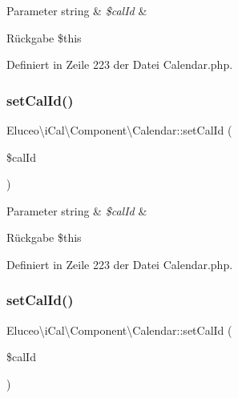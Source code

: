 \begin{DoxyParams}[1]{Parameter}
string & {\em \$cal\+Id} & \\
\hline
\end{DoxyParams}
\begin{DoxyReturn}{Rückgabe}
\$this 
\end{DoxyReturn}


Definiert in Zeile 223 der Datei Calendar.\+php.

\mbox{\label{class_eluceo_1_1i_cal_1_1_component_1_1_calendar_a17acdac642afaf8e87e305fa44621564}} 
\subsubsection{\texorpdfstring{set\+Cal\+Id()}{setCalId()}\hspace{0.1cm}{\footnotesize\ttfamily [2/3]}}
{\footnotesize\ttfamily Eluceo\textbackslash{}i\+Cal\textbackslash{}\+Component\textbackslash{}\+Calendar\+::set\+Cal\+Id (\begin{DoxyParamCaption}\item[{}]{\$cal\+Id }\end{DoxyParamCaption})}


\begin{DoxyParams}[1]{Parameter}
string & {\em \$cal\+Id} & \\
\hline
\end{DoxyParams}
\begin{DoxyReturn}{Rückgabe}
\$this 
\end{DoxyReturn}


Definiert in Zeile 223 der Datei Calendar.\+php.

\mbox{\label{class_eluceo_1_1i_cal_1_1_component_1_1_calendar_a17acdac642afaf8e87e305fa44621564}} 
\subsubsection{\texorpdfstring{set\+Cal\+Id()}{setCalId()}\hspace{0.1cm}{\footnotesize\ttfamily [3/3]}}
{\footnotesize\ttfamily Eluceo\textbackslash{}i\+Cal\textbackslash{}\+Component\textbackslash{}\+Calendar\+::set\+Cal\+Id (\begin{DoxyParamCaption}\item[{}]{\$cal\+Id }\end{DoxyParamCaption})}


